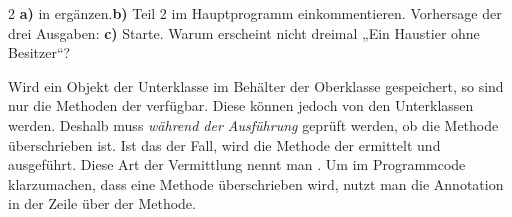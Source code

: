 \documentclass[11pt,a4paper]{article}
\begin{document}
\newpage
\begin{aufgabe}{2}
\textbf{a)}  in  ergänzen.\quad \textbf{b)} Teil 2 im Hauptprogramm einkommentieren. Vorhersage der drei Ausgaben:
\textbf{c)} Starte. Warum erscheint nicht dreimal „Ein Haustier ohne Besitzer“?
\end{aufgabe}

\begin{merke}\lueckentext
Wird ein Objekt der Unterklasse im Behälter der Oberklasse gespeichert, so sind nur die Methoden der  verfügbar. Diese können jedoch von den Unterklassen  werden. Deshalb muss \emph{während der Ausführung} geprüft werden, ob die Methode überschrieben ist. Ist das der Fall, wird die Methode der  ermittelt und ausgeführt. Diese Art der Vermittlung nennt man . Um im Programmcode klarzumachen, dass eine Methode überschrieben wird, nutzt man die Annotation  in der Zeile über der Methode.
\end{merke}
\end{document}
